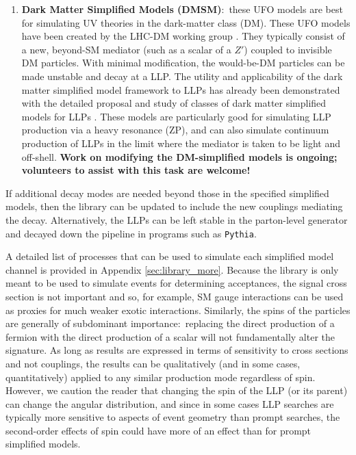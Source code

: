 \begin{enumerate}
\item {\bf Dark Matter Simplified Models (DMSM)}:~these UFO models are best for simulating UV theories in the dark-matter class (DM). These UFO models have been created by the LHC-DM working group \cite{Abdallah:2015ter}. They typically consist of a new, beyond-SM mediator (such as a scalar of a $Z'$) coupled to invisible DM particles. With minimal modification, the would-be-DM particles can be made unstable and decay at a LLP. The utility and applicability of the dark matter simplified model framework to LLPs has already been demonstrated with the detailed proposal and study of classes of dark matter simplified models for LLPs \cite{Buchmueller:2017uqu}.  These models are particularly good for simulating LLP production via a heavy resonance (ZP), and can also simulate continuum production of LLPs in the limit where the mediator is taken to be light and off-shell. {\bf Work on modifying the DM-simplified models is ongoing; volunteers to assist with this task are welcome!}

\end{enumerate}
%
If additional decay modes are needed beyond those in the specified simplified models, then the library can be updated to include the new couplings mediating the decay. Alternatively, the LLPs can be left stable in the parton-level generator and decayed down the pipeline in programs such as \texttt{Pythia}.


A detailed list of processes that can be used to simulate each simplified model channel is provided in Appendix \ref{sec:library_more}. Because the library is only meant to be used to simulate events for determining acceptances, the signal cross section is not important and so, for example, SM gauge interactions can be used as proxies for much weaker exotic interactions. Similarly, the spins of the particles are generally of subdominant importance:~replacing the direct production of a fermion with the direct production of a scalar will not fundamentally alter the signature. As long as results are expressed in terms of sensitivity to cross sections and not couplings, the results can be qualitatively (and in some cases, quantitatively) applied to any similar production mode regardless of spin. However, we caution the reader that changing the spin of the LLP (or its parent) can change the angular distribution, and since in some cases LLP searches are typically more sensitive to aspects of event geometry than prompt searches, the second-order effects of spin could have more of an effect than for prompt simplified models.




